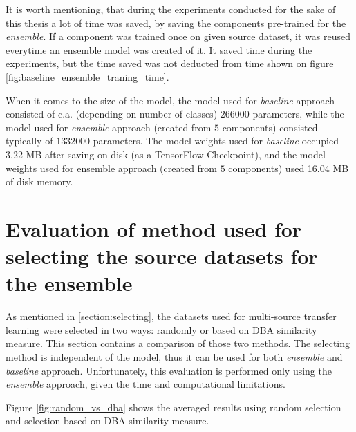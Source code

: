 \documentclass[a4paper,11pt,twoside]{report}
\theoremstyle{definition}
\begin{document}
\FloatBarrier
It is worth mentioning, that during the experiments conducted for the sake of this thesis a lot of time was saved, by saving the components pre-trained for the \textit{ensemble}. If a component was trained once on given source dataset, it was reused everytime an ensemble model was created of it. It saved time during the experiments, but the time saved was not deducted from time shown on figure \ref{fig:baseline_ensemble_traning_time}.

When it comes to the size of the model, the model used for \textit{baseline} approach consisted of c.a. (depending on number of classes) $266 000$ parameters, while the model used for \textit{ensemble} approach (created from $5$ components) consisted typically of $1 332 000$ parameters. The model weights used for \textit{baseline} occupied 3.22 MB after saving on disk (as a TensorFlow Checkpoint), and the model weights used for ensemble approach (created from $5$ components) used 16.04 MB of disk memory.

\section{Evaluation of method used for selecting the source datasets for the ensemble}
As mentioned in \ref{section:selecting}, the datasets used for multi-source transfer learning were selected in two ways: randomly or based on DBA similarity measure. This section contains a comparison of those two methods. The selecting method is independent of the model, thus it can be used for both \textit{ensemble} and \textit{baseline} approach. Unfortunately, this evaluation is performed only using the \textit{ensemble} approach, given the time and computational limitations.

Figure \ref{fig:random_vs_dba} shows the averaged results using random selection and selection based on DBA similarity measure.
\end{document}

